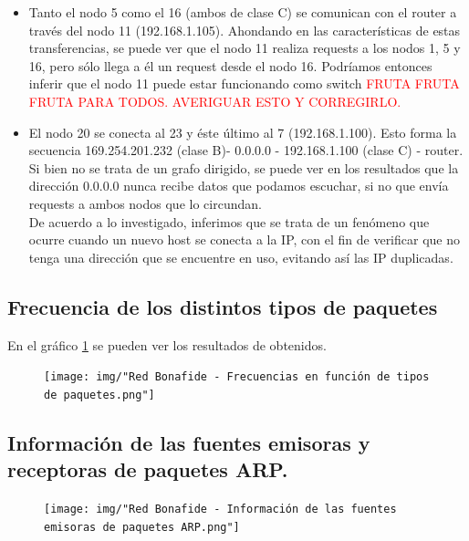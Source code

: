 \begin{itemize}
	\item Tanto el nodo 5 como el 16 (ambos de clase C) se comunican con el router a través del nodo 11 (192.168.1.105). Ahondando en las características de estas transferencias, se puede ver que el nodo 11 realiza requests a los nodos 1, 5 y 16, pero sólo llega a él un request desde el nodo 16. Podríamos entonces inferir que el nodo 11 puede estar funcionando como switch \textcolor{red}{FRUTA FRUTA FRUTA PARA TODOS. AVERIGUAR ESTO Y CORREGIRLO.}
	\item El nodo 20 se conecta al 23 y éste último al 7 (192.168.1.100). Esto forma la secuencia 169.254.201.232 (clase B)- 0.0.0.0 - 192.168.1.100 (clase C) - router. Si bien no se trata de un grafo dirigido, se puede ver en los resultados que la dirección 0.0.0.0 nunca recibe datos que podamos escuchar, si no que envía requests a ambos nodos que lo circundan.\\ De acuerdo a lo investigado, inferimos que se trata de un fenómeno que ocurre cuando un nuevo host se conecta a la IP, con el fin de verificar que no tenga una dirección que se encuentre en uso, evitando así las IP duplicadas.\\
\end{itemize}


\subsection{Frecuencia de los distintos tipos de paquetes}

En el gráfico \ref{bonafide:paquetes} se pueden ver los resultados de obtenidos.

\begin{figure}[h!]
    \centering                                                       
    \texttt{[image: img/"Red Bonafide - Frecuencias en función de tipos de paquetes.png"]}
    \caption{}
    \label{bonafide:paquetes}
\end{figure}

\subsection{Información de las fuentes emisoras y receptoras de paquetes ARP.}

\begin{figure}[h!]
    \centering                                                       
    \texttt{[image: img/"Red Bonafide - Información de las fuentes emisoras de paquetes ARP.png"]}
    \caption{}
    \label{bonafide:emisoras}
\end{figure}

